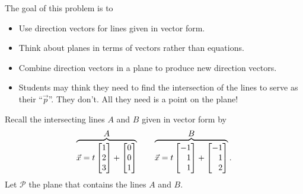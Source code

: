 	\question
	\begin{annotation}
		\begin{goals}

			The goal of this problem is to
			\begin{itemize}
				\item Use direction vectors for lines given in vector form.
				\item Think about planes in terms of vectors rather
					than equations.
				\item Combine direction vectors in a plane to produce new direction vectors.
			\end{itemize}
		\end{goals}

		\begin{notes}
			\begin{itemize}
				\item Students may think they need to find the intersection
					of the lines to serve as their ``$\vec p$''.
					They don't. All they need is a point
					on the plane!
			\end{itemize}
		\end{notes}
	\end{annotation}
	Recall the intersecting lines $A$ and $B$ given in vector form by
	\[
		\overbrace{\vec x=t\mat{1\\2\\3}+\mat{0\\0\\1}}^{\displaystyle A}
		\qquad
		\overbrace{\vec x=t\mat{-1\\1\\1}+\mat{-1\\1\\2}}^{\displaystyle B}.
	\]
	Let $\mathcal P$ the plane that contains the lines $A$ and $B$.
